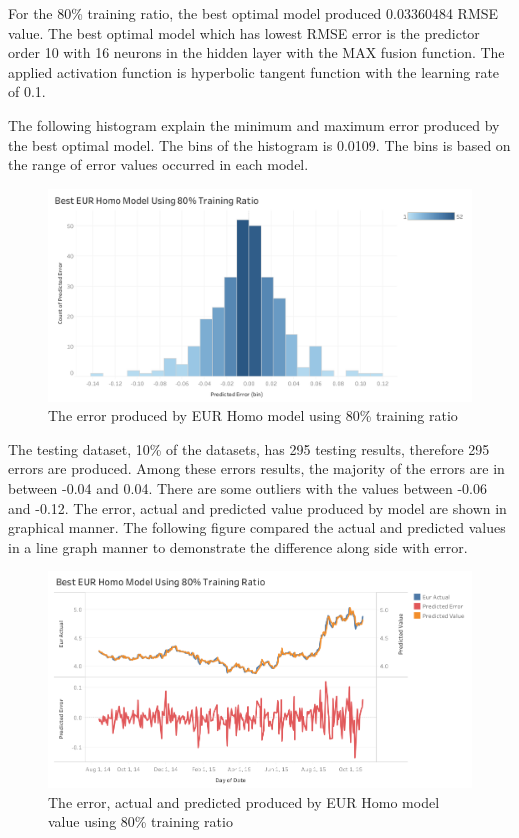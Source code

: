 {{{{{{{{{For the 80\% training ratio, the best optimal model  produced 0.03360484 RMSE value. The best optimal model which has lowest RMSE error is the predictor order 10 with 16 neurons in the hidden layer with the MAX fusion function. The applied activation function is hyperbolic tangent function with the learning rate of 0.1.
	
The following histogram explain the minimum and maximum error produced by the best optimal model. The bins of the histogram is 0.0109. The bins is based on the range of error values occurred in each model.
	
	\begin{figure}[hbt!]\centering
		\includegraphics[width=1\textwidth]{homo_eur_80}
		\caption{The error produced by EUR Homo model using 80\% training ratio}
	\end{figure}
	
The testing dataset, 10\% of the datasets, has 295 testing results, therefore 295 errors are produced. Among these errors results, the majority of the errors are in between -0.04 and 0.04. There are some outliers with the values between -0.06 and -0.12. The error, actual and predicted value produced by model are shown in graphical manner. The following figure   compared the actual and predicted values in a line graph manner to demonstrate the difference along side with error.
	
	
	\begin{figure}[hbt!]\centering
		\includegraphics[width=1\textwidth]{best_eur_homo_APV_80}
		\caption{The error, actual and predicted produced by EUR Homo model  value using 80\% training ratio }
	\end{figure}

}}}}}}}}}
